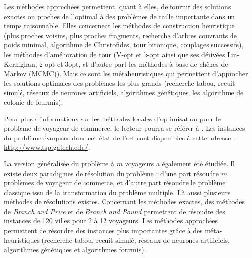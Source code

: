 Les méthodes approchées permettent, quant à elles, de fournir des solutions exactes ou proches de l'optimal à des problèmes de taille importante dans un temps raisonnable. Elles concernent les méthodes de construction heuristique (plus proches voisins, plus proches fragments, recherche d'arbres couvrants de poids minimal, algorithme de Christofides, tour bitonique, couplages successifs), les méthodes d'amélioration de tour (V-opt et k-opt ainsi que ses dérivées Lin-Kernighan, 2-opt et 3opt, et d'autre part les méthodes à base de chênes de Markov (MCMC)). Mais ce sont les métaheuristiques qui permettent d'approcher les solutions optimales des problèmes les plus grands (recherche tabou, recuit simulé, réseaux de neurones artificiels, algorithmes génétiques, les algorithme de colonie de fourmis).

Pour plus d'informations sur les méthodes locales d'optimisation pour le problème de voyageur de commerce, le lecteur pourra se référer à \cite{Johnson1997}. Les instances du problème évoquées dans cet état de l'art sont disponibles à cette adresse~: \href{http://www.tsp.gatech.edu/}{http://www.tsp.gatech.edu/}.

La version généralisée du problème à $m$ voyageurs a également été étudiée. Il existe deux paradigmes de résolution du problème : d'une part résoudre $m$ problèmes de voyageur de commerce, et d'autre part résoudre le problème classique issu de la transformation du problème multiple. Là aussi plusieurs méthodes de résolutions existes. Concernant les méthodes exactes, des méthodes de \textit{Branch and Price} et de \textit{Branch and Bound} permettent de résoudre des instances de 120 villes pour 2 à 12 voyageurs. Les méthodes approchées permettent de résoudre des instances plus importantes grâce à des méta-heuristiques (recherche tabou, recuit simulé, réseaux de neurones artificiels, algorithmes génétiques et algorithmes fourmis). 